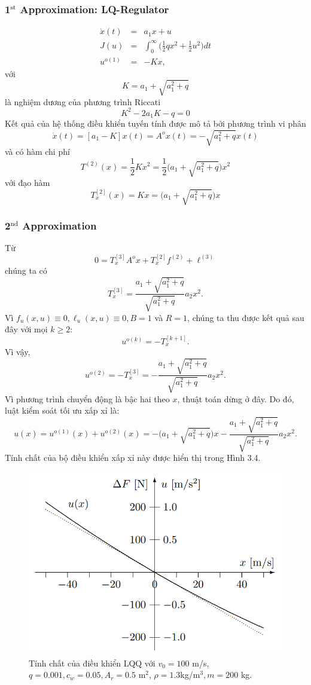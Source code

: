 \documentclass[12pt,a4paper]{report}
\begin{document}
\subsubsection{\textbf{1}$^\text{st}$ Approximation: LQ-Regulator} \begin{eqnarray}
	\dot{x}(t) &=&a_1x + u \nonumber \\ J(u) &=& \int_{0}^{\infty}\Big(\frac{1}{2}qx^2+\frac{1}{2}u^2\Big)dt \nonumber \\ u^{o(1)}&=&-Kx, \nonumber
\end{eqnarray} với $$K = a_1 + \sqrt{a_1^2+q}$$ là nghiệm dương của phương trình Riccati $$K^2-2a_1K-q=0$$ Kết quả của hệ thống điều khiển tuyến tính được mô tả bởi phương trình vi phân $$\dot{x}(t) = [a_1 - K]x(t) = A^ox(t) = -\sqrt{a_1^2+q}x(t)$$ và có hàm chi phí $$T^{(2)}(x) = \frac{1}{2}Kx^2 = \frac{1}{2}\bigg(a_1 + \sqrt{a_1^2+q}\bigg)x^2$$ với đạo hàm $$T_x^{[2]}(x) = Kx = \bigg(a_1 + \sqrt{a_1^2 + q}\bigg)x$$
\subsubsection{\textbf{2}$^\text{nd}$ Approximation}
Từ $$0 = T_x^{[3]}A^ox + T_x^{[2]}f^{(2)} + \ell^{(3)}$$ chúng ta có $$T_x^{[3]} = \frac{a_1 + \sqrt{a_1^2 + q}}{\sqrt{a_1^2 + q}}a_2x^2.$$ Vì $f_u(x, u) \equiv 0, \ell_u(x,u) \equiv 0, B=1$ và $R=1$, chúng ta thu được kết quả sau đây với mọi $k \geq 2$: $$u^{o(k)} = -T_x^{[k+1]}.$$ Vì vậy, $$u^{o(2)} = -T_x^{[3]} = -\frac{a_1+\sqrt{a_1^2+q}}{\sqrt{a_1^2+q}}a_2x^2.$$ Vì phương trình chuyển động là bậc hai theo $x$, thuật toán dừng ở đây. Do đó, luật kiểm soát tối ưu xấp xỉ là: $$u(x) = u^{o(1)}(x) + u^{o(2)}(x) = -\Big(a_1 + \sqrt{a_1^2+q} \Big)x - \frac{a_1 + \sqrt{a_1^2+q}}{\sqrt{a_1^2+q}}a_2x^2.$$ Tính chất của bộ điều khiển xấp xỉ này được hiển thị trong Hình 3.4.
\begin{figure}[h]
	\centering
	\includegraphics[scale=.55]{hinh6ct.png}
	\caption{Tính chất của điều khiển LQQ với $v_0 = 100$ m/s, $q = 0.001, c_w = 0.05, A_r = 0.5$ m$^2$, $\rho=1.3$kg/m$^3, m = 200$ kg.}
\end{figure}
\end{document}
